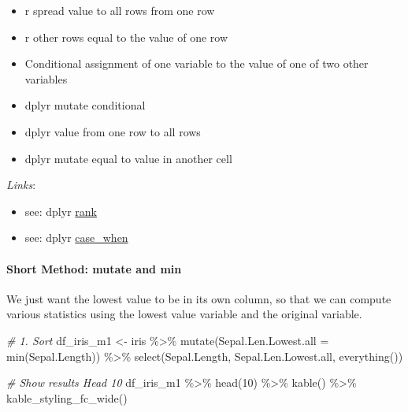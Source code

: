 \documentclass[
]{book}
\newenvironment{Shaded}{\begin{snugshade}}{\end{snugshade}}
\newcommand{\AttributeTok}[1]{\textcolor[rgb]{0.77,0.63,0.00}{#1}}
\newcommand{\CommentTok}[1]{\textcolor[rgb]{0.56,0.35,0.01}{\textit{#1}}}
\newcommand{\DecValTok}[1]{\textcolor[rgb]{0.00,0.00,0.81}{#1}}
\newcommand{\FunctionTok}[1]{\textcolor[rgb]{0.00,0.00,0.00}{#1}}
\newcommand{\NormalTok}[1]{#1}
\newcommand{\OtherTok}[1]{\textcolor[rgb]{0.56,0.35,0.01}{#1}}
\newcommand{\SpecialCharTok}[1]{\textcolor[rgb]{0.00,0.00,0.00}{#1}}
\providecommand{\tightlist}{%
  \setlength{\itemsep}{0pt}\setlength{\parskip}{0pt}}
\begin{document}
\begin{itemize}
\tightlist
\item
  r spread value to all rows from one row
\item
  r other rows equal to the value of one row
\item
  Conditional assignment of one variable to the value of one of two other variables
\item
  dplyr mutate conditional
\item
  dplyr value from one row to all rows
\item
  dplyr mutate equal to value in another cell
\end{itemize}

\emph{Links}:

\begin{itemize}
\tightlist
\item
  see: dplyr \href{https://dplyr.tidyverse.org/reference/ranking.html}{rank}
\item
  see: dplyr \href{https://dplyr.tidyverse.org/reference/case_when.html}{case\_when}
\end{itemize}

\hypertarget{short-method-mutate-and-min}{%
\paragraph{Short Method: mutate and min}\label{short-method-mutate-and-min}}

We just want the lowest value to be in its own column, so that we can compute various statistics using the lowest value variable and the original variable.

\begin{Shaded}
\begin{Highlighting}[]
\CommentTok{\# 1. Sort}
\NormalTok{df\_iris\_m1 }\OtherTok{\textless{}{-}}\NormalTok{ iris }\SpecialCharTok{\%\textgreater{}\%} \FunctionTok{mutate}\NormalTok{(}\AttributeTok{Sepal.Len.Lowest.all =} \FunctionTok{min}\NormalTok{(Sepal.Length)) }\SpecialCharTok{\%\textgreater{}\%}
                \FunctionTok{select}\NormalTok{(Sepal.Length, Sepal.Len.Lowest.all, }\FunctionTok{everything}\NormalTok{())}


\CommentTok{\# Show results Head 10}
\NormalTok{df\_iris\_m1 }\SpecialCharTok{\%\textgreater{}\%} \FunctionTok{head}\NormalTok{(}\DecValTok{10}\NormalTok{) }\SpecialCharTok{\%\textgreater{}\%}
  \FunctionTok{kable}\NormalTok{() }\SpecialCharTok{\%\textgreater{}\%}
  \FunctionTok{kable\_styling\_fc\_wide}\NormalTok{()}
\end{Highlighting}
\end{Shaded}
\end{document}
